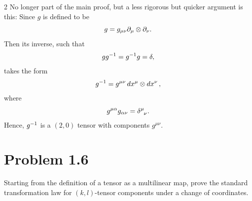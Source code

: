 \documentclass[12pt,a4paper]{article}
\begin{document}
\begin{solution_pset}
\begin{multicols*}{2}
			No longer part of the main proof, but a less rigorous but quicker argument is this:
			Since $g$ is defined to be
			\[
				g = g_{\mu\nu}\partial_\mu \otimes \partial_\nu.
			\]
			Then its inverse, such that
			\[
				gg^{-1} = g^{-1} g = \delta,
			\]
			takes the form
			\[
				g^{-1} = g^{\mu\nu} \dd{x^\mu}\otimes \dd{x^\nu},
			\]
			where
			\[
				g^{\mu\alpha}g_{\alpha\nu} = \delta\indices{^\mu_\nu}.
			\]
			Hence, $g^{-1}$ is a $(2,0)$ tensor with components $g^{\mu\nu}$.
		\end{multicols*}
	\end{solution_pset}
	\newpage
	\section*{
		Problem 1.6
	}
	\begin{problem}
		Starting from the definition of a tensor as a multilinear map, prove the 
		standard transformation law for $(k,l)$-tensor components under a change of coordinates.
	\end{problem}
\end{document}
